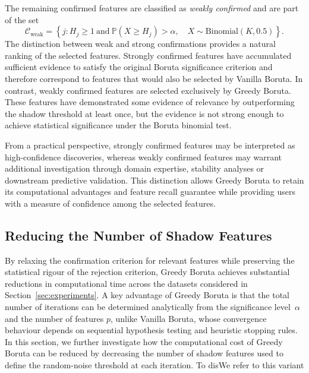 \documentclass[runningheads]{llncs}
\begin{document}
The remaining confirmed features are classified as \emph{weakly confirmed} and are part of the set
\[
\mathcal{C}_{\mathrm{weak}}
=
\left\{
j :
H_j \geq 1
\ \text{and}\
\mathbb{P}\!\left(
X \geq H_j
\right)
>
\alpha,
\quad
X \sim \mathrm{Binomial}(K,0.5)
\right\}.
\]
The distinction between weak and strong confirmations provides a natural ranking of the selected features. Strongly confirmed features have accumulated sufficient evidence to satisfy the original Boruta significance criterion and therefore correspond to features that would also be selected by Vanilla Boruta. In contrast, weakly confirmed features are selected exclusively by Greedy Boruta. These features have demonstrated some evidence of relevance by outperforming the shadow threshold at least once, but the evidence is not strong enough to achieve statistical significance under the Boruta binomial test.

From a practical perspective, strongly confirmed features may be interpreted as high-confidence discoveries, whereas weakly confirmed features may warrant additional investigation through domain expertise, stability analyses or downstream predictive validation. This distinction allows Greedy Boruta to retain its computational advantages and feature recall guarantee while providing users with a measure of confidence among the selected features.

\subsection{Reducing the Number of Shadow Features}

By relaxing the confirmation criterion for relevant features while preserving the statistical rigour of the rejection criterion, Greedy Boruta achieves substantial reductions in computational time across the datasets considered in Section~\ref{sec:experiments}. A key advantage of Greedy Boruta is that the total number of iterations can be determined analytically from the significance level~\(\alpha\) and the number of features $p$, unlike Vanilla Boruta, whose convergence behaviour depends on sequential hypothesis testing and heuristic stopping rules. In this section, we further investigate how the computational cost of Greedy Boruta can be reduced by decreasing the number of shadow features used to define the random-noise threshold at each iteration. To disWe refer to this variant

\end{document}
